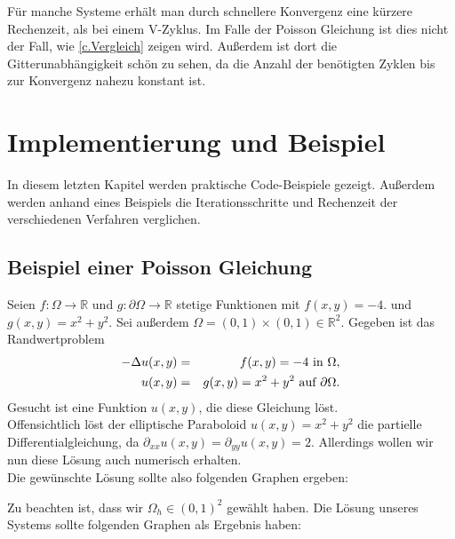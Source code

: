Für manche Systeme erhält man durch schnellere Konvergenz eine kürzere Rechenzeit, als bei einem V-Zyklus. Im Falle der Poisson Gleichung ist dies nicht der Fall, wie \autoref{c.Vergleich} zeigen wird. Außerdem ist dort die Gitterunabhängigkeit schön zu sehen, da die Anzahl der benötigten Zyklen bis zur Konvergenz nahezu konstant ist.

\chapter{Implementierung und Beispiel}\label{c.Vergleich}

In diesem letzten Kapitel werden praktische Code-Beispiele gezeigt. Außerdem werden anhand eines Beispiels die Iterationsschritte und Rechenzeit der verschiedenen Verfahren verglichen.

\section{Beispiel einer Poisson Gleichung}\label{s.Beispiel einer Poisson Gleichung}

Seien $f: \Omega \rightarrow \mathbb{R}$ und $g: \partial\Omega \rightarrow \mathbb{R}$ stetige Funktionen mit $f(x,y) = -4.$ und $g(x,y) = x^{2} + y^{2}$. Sei außerdem $\Omega = (0,1)\times(0,1) \in \mathbb{R}^{2}$. Gegeben ist das Randwertproblem
\begin{eqnarray}
        -\Delta u(x,y) &=& f(x,y) = -4 \textnormal{ in } \Omega, \\
    u(x,y) &=& g(x,y) = x^{2} + y^{2} \textnormal{ auf } \partial \Omega.
\end{eqnarray}
Gesucht ist eine Funktion $u(x,y)$, die diese Gleichung löst. \\
Offensichtlich löst der elliptische Paraboloid $u(x,y) = x^{2} + y^{2}$ die partielle Differentialgleichung, da $\partial_{xx}u(x,y) = \partial_{yy}u(x,y) = 2$. Allerdings wollen wir nun diese Lösung auch numerisch erhalten.\\
Die gewünschte Lösung sollte also folgenden Graphen ergeben:


Zu beachten ist, dass wir $\Omega_{h} \in (0,1)^{2}$ gewählt haben. Die Lösung unseres Systems sollte folgenden Graphen als Ergebnis haben:


